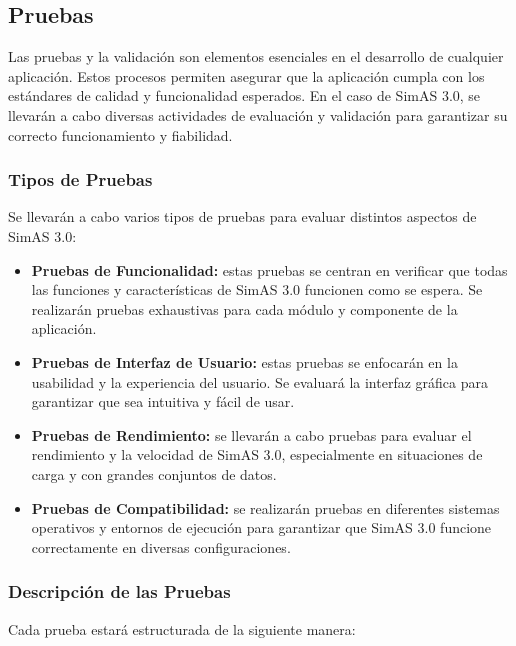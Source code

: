 \subsection{Pruebas}
Las pruebas y la validación son elementos esenciales en el desarrollo de cualquier aplicación. Estos procesos permiten asegurar que la aplicación cumpla con los estándares de calidad y funcionalidad esperados. En el caso de SimAS 3.0, se llevarán a cabo diversas actividades de evaluación y validación para garantizar su correcto funcionamiento y fiabilidad.

\subsubsection{Tipos de Pruebas}

Se llevarán a cabo varios tipos de pruebas para evaluar distintos aspectos de SimAS 3.0:

\begin{itemize}
    \item \textbf{Pruebas de Funcionalidad:} estas pruebas se centran en verificar que todas las funciones y características de SimAS 3.0 funcionen como se espera. Se realizarán pruebas exhaustivas para cada módulo y componente de la aplicación.
    
    \item \textbf{Pruebas de Interfaz de Usuario:} estas pruebas se enfocarán en la usabilidad y la experiencia del usuario. Se evaluará la interfaz gráfica para garantizar que sea intuitiva y fácil de usar.

    \item \textbf{Pruebas de Rendimiento:} se llevarán a cabo pruebas para evaluar el rendimiento y la velocidad de SimAS 3.0, especialmente en situaciones de carga y con grandes conjuntos de datos.

    \item \textbf{Pruebas de Compatibilidad:} se realizarán pruebas en diferentes sistemas operativos y entornos de ejecución para garantizar que SimAS 3.0 funcione correctamente en diversas configuraciones.
\end{itemize}

\subsubsection{Descripción de las Pruebas}

Cada prueba estará estructurada de la siguiente manera:

